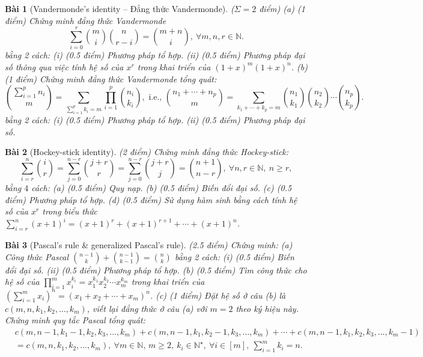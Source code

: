 \documentclass{article}
\newtheorem{baitoan}{Bài}
\begin{document}
\begin{baitoan}[Vandermonde's identity -- Đẳng thức Vandermonde]
    {\rm($\Sigma = 2$ điểm)} (a) {\rm(1 điểm)} Chứng minh đẳng thức Vandermonde
    \begin{equation*}
        \sum_{i=0}^r \binom{m}{i}\binom{n}{r - i} = \binom{m + n}{i},\ \forall m,n,r\in\mathbb{N}.
    \end{equation*}
    bằng 2 cách: (i) {\rm(0.5 điểm)} Phương pháp tổ hợp. (ii) {\rm(0.5 điểm)} Phương pháp đại số thông qua việc tính hệ số của $x^r$ trong khai triển của $(1 + x)^m(1 + x)^n$. (b) {\rm(1 điểm)} Chứng minh đẳng thức Vandermonde tổng quát:
    \begin{equation*}
        \binom{\sum_{i=1}^p n_i}{m} = \sum_{\sum_{i=1}^p k_i = m} \prod_{i=1}^p \binom{n_i}{k_i},\mbox{ i.e., }\binom{n_1 + \cdots + n_p}{m} = \sum_{k_1 + \cdots + k_p = m} \binom{n_1}{k_1}\binom{n_2}{k_2}\cdots\binom{n_p}{k_p}.
    \end{equation*}
    bằng 2 cách: (i) {\rm(0.5 điểm)} Phương pháp tổ hợp. (ii) {\rm(0.5 điểm)} Phương pháp đại số.
\end{baitoan}

\begin{baitoan}[Hockey-stick identity]
    {\rm(2 điểm)} Chứng minh đẳng thức Hockey-stick:
    \begin{equation*}
        \sum_{i=r}^n \binom{i}{r} = \sum_{j=0}^{n - r} \binom{j + r}{r} = \sum_{j=0}^{n - r} \binom{j + r}{j} = \binom{n + 1}{n - r},\ \forall n,r\in\mathbb{N},\ n\ge r,
    \end{equation*}
    bằng $4$ cách: (a) {\rm(0.5 điểm)} Quy nạp. (b) {\rm(0.5 điểm)} Biến đổi đại số. (c) {\rm(0.5 điểm)} Phương pháp tổ hợp. (d) {\rm(0.5 điểm)} Sử dụng hàm sinh bằng cách tính hệ số của $x^r$ trong biểu thức $\sum_{i=r}^n (x + 1)^i = (x + 1)^r + (x + 1)^{r + 1} + \cdots + (x + 1)^n$.
\end{baitoan}

\begin{baitoan}[Pascal's rule \& generalized Pascal's rule]
    {\rm(2.5 điểm)} Chứng minh: (a) Công thức Pascal $\binom{n - 1}{k} + \binom{n - 1}{k - 1} = \binom{n}{k}$ bằng 2 cách: (i) {\rm(0.5 điểm)} Biến đổi đại số. (ii) {\rm(0.5 điểm)} Phương pháp tổ hợp. (b) {\rm(0.5 điểm)} Tìm công thức cho hệ số của $\prod_{i=1}^m x_i^{k_i} = x_1^{k_1}x_2^{k_2}\cdots x_m^{k_m}$ trong khai triển của $\left(\sum_{i=1}^m x_i\right)^n = (x_1 + x_2 + \cdots + x_m)^n$. (c) {\rm(1 điểm)} Đặt hệ số ở câu (b) là $c(m,n,k_1,k_2,\ldots,k_m)$, viết lại đẳng thức ở câu (a) với $m = 2$ theo ký hiệu này. Chứng minh quy tắc Pascal tổng quát:
    \begin{align*}
        &c(m,n - 1,k_1 - 1,k_2,k_3,\ldots,k_m) + c(m,n - 1,k_1,k_2 - 1,k_3,\ldots,k_m) + \cdots + c(m,n - 1,k_1,k_2,k_3,\ldots,k_m - 1)\\
        &= c(m,n,k_1,k_2,\ldots,k_m),\ \forall m\in\mathbb{N},\,m\ge2,\ k_i\in\mathbb{N}^\star,\ \forall i\in[m],\ \sum_{i=1}^m k_i = n.
    \end{align*}
\end{baitoan}
\end{document}
